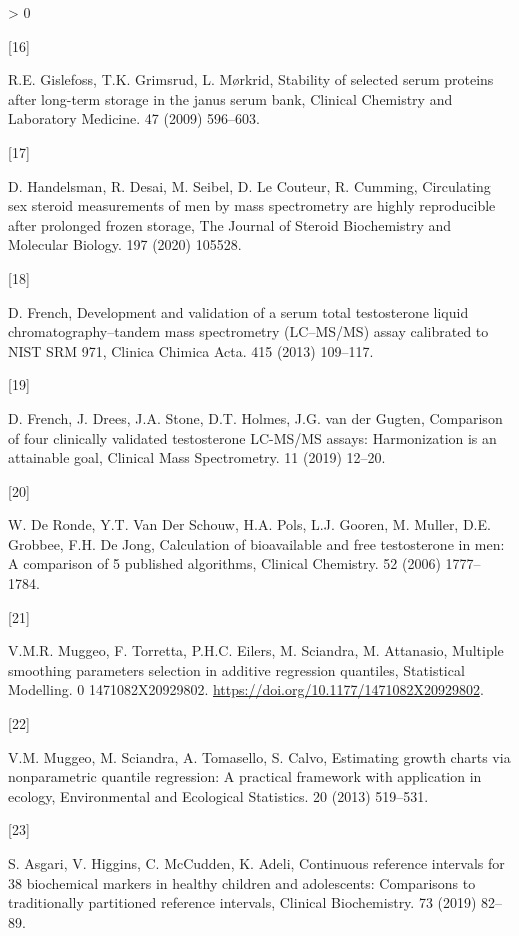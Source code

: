 \documentclass[]{elsarticle} %
\newlength{\csllabelwidth}
\newlength{\cslhangindent}
\newenvironment{CSLReferences}[3] %
 {%
  \setlength{\parindent}{0pt}
  \ifodd #1 \everypar{\setlength{\hangindent}{\cslhangindent}}\ignorespaces\fi
  \ifnum #2 > 0
  \setlength{\parskip}{#2\baselineskip}
  \fi
 }%
 {}
\newcommand{\CSLLeftMargin}[1]{\parbox[t]{\csllabelwidth}{#1}}
\newcommand{\CSLRightInline}[1]{\parbox[t]{\linewidth - \csllabelwidth}{#1}}
\begin{document}
\begin{CSLReferences}{0}{0}
\leavevmode\hypertarget{ref-gislefoss2009stability}{}%
\CSLLeftMargin{{[}16{]} }
\CSLRightInline{R.E. Gislefoss, T.K. Grimsrud, L. Mørkrid, Stability of
selected serum proteins after long-term storage in the janus serum bank,
Clinical Chemistry and Laboratory Medicine. 47 (2009) 596--603.}

\leavevmode\hypertarget{ref-handelsman2020circulating}{}%
\CSLLeftMargin{{[}17{]} }
\CSLRightInline{D. Handelsman, R. Desai, M. Seibel, D. Le Couteur, R.
Cumming, Circulating sex steroid measurements of men by mass
spectrometry are highly reproducible after prolonged frozen storage, The
Journal of Steroid Biochemistry and Molecular Biology. 197 (2020)
105528.}

\leavevmode\hypertarget{ref-french2013development}{}%
\CSLLeftMargin{{[}18{]} }
\CSLRightInline{D. French, Development and validation of a serum total
testosterone liquid chromatography--tandem mass spectrometry (LC--MS/MS)
assay calibrated to NIST SRM 971, Clinica Chimica Acta. 415 (2013)
109--117.}

\leavevmode\hypertarget{ref-french2019comparison}{}%
\CSLLeftMargin{{[}19{]} }
\CSLRightInline{D. French, J. Drees, J.A. Stone, D.T. Holmes, J.G. van
der Gugten, Comparison of four clinically validated testosterone
LC-MS/MS assays: Harmonization is an attainable goal, Clinical Mass
Spectrometry. 11 (2019) 12--20.}

\leavevmode\hypertarget{ref-de2006calculation}{}%
\CSLLeftMargin{{[}20{]} }
\CSLRightInline{W. De Ronde, Y.T. Van Der Schouw, H.A. Pols, L.J.
Gooren, M. Muller, D.E. Grobbee, F.H. De Jong, Calculation of
bioavailable and free testosterone in men: A comparison of 5 published
algorithms, Clinical Chemistry. 52 (2006) 1777--1784.}

\leavevmode\hypertarget{ref-quantreg1}{}%
\CSLLeftMargin{{[}21{]} }
\CSLRightInline{V.M.R. Muggeo, F. Torretta, P.H.C. Eilers, M. Sciandra,
M. Attanasio, Multiple smoothing parameters selection in additive
regression quantiles, Statistical Modelling. 0 1471082X20929802.
\url{https://doi.org/10.1177/1471082X20929802}.}

\leavevmode\hypertarget{ref-quantreg2}{}%
\CSLLeftMargin{{[}22{]} }
\CSLRightInline{V.M. Muggeo, M. Sciandra, A. Tomasello, S. Calvo,
Estimating growth charts via nonparametric quantile regression: A
practical framework with application in ecology, Environmental and
Ecological Statistics. 20 (2013) 519--531.}

\leavevmode\hypertarget{ref-asgari_continuous_2019}{}%
\CSLLeftMargin{{[}23{]} }
\CSLRightInline{S. Asgari, V. Higgins, C. McCudden, K. Adeli, Continuous
reference intervals for 38 biochemical markers in healthy children and
adolescents: Comparisons to traditionally partitioned reference
intervals, Clinical Biochemistry. 73 (2019) 82--89.}


\end{CSLReferences}
\end{document}
